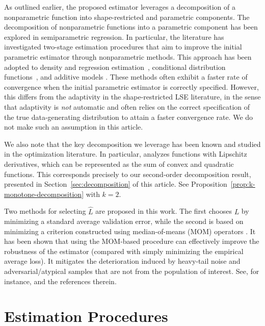 \documentclass[12pt]{article}
\begin{document}
As outlined earlier, the proposed estimator leverages a decomposition of a nonparametric function into shape-restricted and parametric components. The decomposition of nonparametric functions into a parametric component has been explored in semiparametric regression. In particular, the literature has investigated two-stage estimation procedures that aim to improve the initial parametric estimator through nonparametric methods. This approach has been adopted to density and regression estimation~\citep{hjort1995nonparametric, hjort1996locally, eguchi2003local}, conditional distribution functions~\citep{veraverbeke2014preadjusted}, and additive models \citep{lin2009adaptive}. These methods often exhibit a faster rate of convergence when the initial parametric estimator is correctly specified. However, this differs from the adaptivity in the shape-restricted LSE literature, in the sense that adaptivity is \textit{not} automatic and often relies on the correct specification of the true data-generating distribution to attain a faster convergence rate. We do not make such an assumption in this article. 

We also note that the key decomposition we leverage has been known and studied in the optimization literature. In particular, \cite{zlobec2006characterization} analyzes functions with Lipschitz derivatives, which can be represented as the sum of convex and quadratic functions. This corresponds precisely to our second-order decomposition result, presented in Section~\ref{sec:decomposition} of this article. See Proposition~\ref{prop:k-monotone-decomposition} with $k=2$.

Two methods for selecting $\widehat L$ are proposed in this work. The first chooses $L$ by minimizing a standard average validation error, while the second is based on minimizing a criterion constructed using median-of-means (MOM) operators \citep{nemirovskiĭ1983problem}. It has been shown that using the MOM-based procedure can effectively improve the robustness of the estimator (compared with simply minimizing the empirical average loss). It mitigates the deterioration induced by heavy-tail noise and adversarial/atypical samples that are not from the population of interest. See, for instance, \cite{lecue2020robust, lugosi2019risk} and the references therein.

\section{Estimation Procedures}
\end{document}
